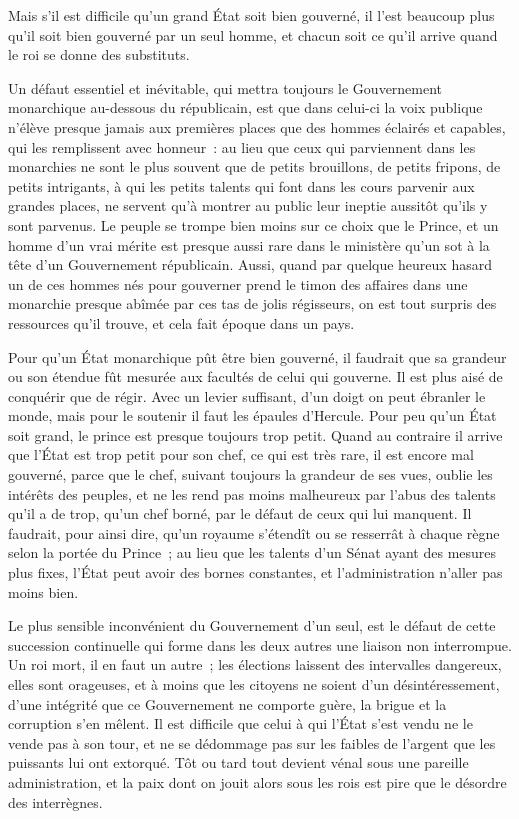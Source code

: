 \documentclass[french,twoside]{book} %
\begin{document}
Mais s’il est difficile qu’un grand État soit bien gouverné, il l’est beaucoup plus qu’il soit bien gouverné par un seul homme, et chacun soit ce qu’il arrive quand le roi se donne des substituts.\par
Un défaut essentiel et inévitable, qui mettra toujours le Gouvernement monarchique au-dessous du républicain, est que dans celui-ci la voix publique n’élève presque jamais aux premières places que des hommes éclairés et capables, qui les remplissent avec honneur : au lieu que ceux qui parviennent dans les monarchies ne sont le plus souvent que de petits brouillons, de petits fripons, de petits intrigants, à qui les petits talents qui font dans les cours parvenir aux grandes places, ne servent qu’à montrer au public leur ineptie aussitôt qu’ils y sont parvenus. Le peuple se trompe bien moins sur ce choix que le Prince, et un homme d’un vrai mérite est presque aussi rare dans le ministère qu’un sot à la tête d’un Gouvernement républicain. Aussi, quand par quelque heureux hasard un de ces hommes nés pour gouverner prend le timon des affaires dans une monarchie presque abîmée par ces tas de jolis régisseurs, on est tout surpris des ressources qu’il trouve, et cela fait époque dans un pays.\par
Pour qu’un État monarchique pût être bien gouverné, il faudrait que sa grandeur ou son étendue fût mesurée aux facultés de celui qui gouverne. Il est plus aisé de conquérir que de régir. Avec un levier suffisant, d’un doigt on peut ébranler le monde, mais pour le soutenir il faut les épaules d’Hercule. Pour peu qu’un État soit grand, le prince est presque toujours trop petit. Quand au contraire il arrive que l’État est trop petit pour son chef, ce qui est très rare, il est encore mal gouverné, parce que le chef, suivant toujours la grandeur de ses vues, oublie les intérêts des peuples, et ne les rend pas moins malheureux par l’abus des talents qu’il a de trop, qu’un chef borné, par le défaut de ceux qui lui manquent. Il faudrait, pour ainsi dire, qu’un royaume s’étendît ou se resserrât à chaque règne selon la portée du Prince ; au lieu que les talents d’un Sénat ayant des mesures plus fixes, l’État peut avoir des bornes constantes, et l’administration n’aller pas moins bien.\par
Le plus sensible inconvénient du Gouvernement d’un seul, est le défaut de cette succession continuelle qui forme dans les deux autres une liaison non interrompue. Un roi mort, il en faut un autre ; les élections laissent des intervalles dangereux, elles sont orageuses, et à moins que les citoyens ne soient d’un désintéressement, d’une intégrité que ce Gouvernement ne comporte guère, la brigue et la corruption s’en mêlent. Il est difficile que celui à qui l’État s’est vendu ne le vende pas à son tour, et ne se dédommage pas sur les faibles de l’argent que les puissants lui ont extorqué. Tôt ou tard tout devient vénal sous une pareille administration, et la paix dont on jouit alors sous les rois est pire que le désordre des interrègnes.\par
\end{document}
